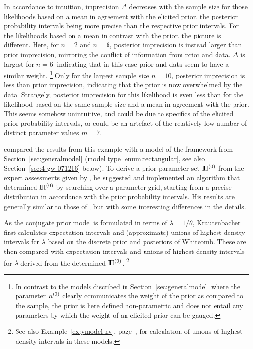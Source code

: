 In accordance to intuition, imprecision $\Delta$ decreases with the sample size
for those likelihoods based on a mean in agreement with the elicited prior,
the posterior probability intervals being more precise than the respective prior intervals.
For the likelihoods based on a mean in contrast with the prior, the picture is different.
Here, for $n=2$ and $n=6$, posterior imprecision is instead larger than prior imprecision,
mirroring the conflict of information from prior and data.
$\Delta$ is largest for $n=6$,
indicating that in this case prior and data seem to have a similar weight.%
\footnote{In contrast to the models discribed in Section~\ref{sec:generalmodel}
where the parameter $n^{(0)}$ clearly communicates the weight of the prior as compared to the sample,
the prior is here defined non-parametric and does not entail any parameters
by which the weight of an elicited prior can be gauged.}
Only for the largest sample size $n=10$, posterior imprecision is less than prior imprecision,
indicating that the prior is now overwhelmed by the data.
Strangely, posterior imprecision for this likelihood is even less than
for the likelihood based on the same sample size and a mean in agreement with the prior.
This seems somehow unintuitive, and could be due to specifics of the elicited prior probability intervals,
or could be an artefact of the relatively low number of distinct parameter values $m = 7$.

\textcite[\S 4]{2011:krautenbacher} compared the results from this example %
with a model of the framework from Section~\ref{sec:generalmodel}
(model type \ref{enum:rectangular}, see also Section~\ref{sec:4-gw-071216} below).
To derive a prior parameter set $\text{I}\!\Pi^{(0)}$ from the expert assessments given by \textcite[Table~I]{2005:whitcomb}, %
he suggested and implemented an algorithm that determined $\text{I}\!\Pi^{(0)}$
by searching over a parameter grid, starting from a precise distribution
in accordance with the prior probability intervals.
His results are generally similar to those of \textcite[\S 4.1]{2005:whitcomb},
but with some interesting differences in the details.

As the conjugate prior model is formulated in terms of $\lambda = 1/\theta$,
Krautenbacher first calculates 
expectation intervals and (approximate) unions of highest density intervals for $\lambda$
based on the discrete prior and posteriors of Whitcomb.
These are then compared with
expectation intervals and unions of highest density intervals for $\lambda$
derived from the determined $\text{I}\!\Pi^{(0)}$.%
\footnote{See also Example~\ref{ex:ymodel-nv}, page~\pageref{ex:ymodel-nv},
for calculation of unions of highest density intervals in these models.}

